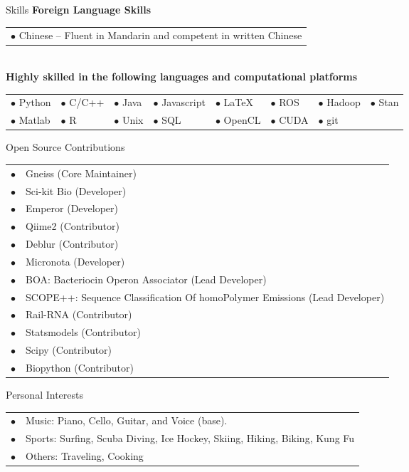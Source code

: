 \documentclass{resume} %
\begin{document}
\begin{rSection}{Skills}
  \textbf{Foreign Language Skills}\\
  \begin{tabular}{l}
    $\bullet$ Chinese --  Fluent in Mandarin and competent in written Chinese\\
  \end{tabular}\\
  \textbf{Highly skilled in the following languages and computational platforms}\\
  \begin{tabular}{llllllll}
     $\bullet$ Python   &  $\bullet$ C/C++ &  $\bullet$ Java  & $\bullet$ Javascript &  $\bullet$ \LaTeX   &  $\bullet$ ROS    &  $\bullet$ Hadoop & $\bullet$ Stan\\
     $\bullet$ Matlab   &  $\bullet$ R     &  $\bullet$ Unix   & $\bullet$ SQL      &  $\bullet$ OpenCL   &  $\bullet$ CUDA   &   $\bullet$ git\\
  \end{tabular}\newpage
\end{rSection}
\begin{rSection}{Open Source Contributions}
  \begin{tabular}{ll}
      $\bullet$ & Gneiss (Core Maintainer)\\
      $\bullet$ & Sci-kit Bio (Developer)\\
      $\bullet$ & Emperor (Developer)\\
      $\bullet$ & Qiime2 (Contributor)\\
      $\bullet$ & Deblur (Contributor)\\
      $\bullet$ & Micronota (Developer)\\
      $\bullet$ & BOA: Bacteriocin Operon Associator (Lead Developer)\\
      $\bullet$ & SCOPE++: Sequence Classification Of homoPolymer Emissions (Lead Developer)\\
      $\bullet$ & Rail-RNA (Contributor)\\
      $\bullet$ & Statsmodels (Contributor)\\
      $\bullet$ & Scipy (Contributor)\\
      $\bullet$ & Biopython (Contributor)\\
  \end{tabular}
\end{rSection}

\begin{rSection}{Personal Interests}
  \begin{tabular}{ll}
      $\bullet$ & Music: Piano, Cello, Guitar, and Voice (base).\\
      $\bullet$ & Sports: Surfing, Scuba Diving, Ice Hockey, Skiing, Hiking, Biking, Kung Fu \\
      $\bullet$ & Others: Traveling, Cooking\\
  \end{tabular}
\end{rSection}

\end{document}
